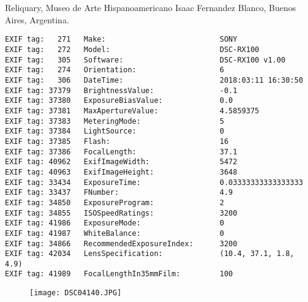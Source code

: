 \section{\protect{}}
\noindent Reliquary, Museo de Arte Hispanoamericano Isaac Fernandez Blanco, Buenos Aires, Argentina.
\noindent
\begin{lstlisting}
EXIF tag:   271   Make:                          SONY
EXIF tag:   272   Model:                         DSC-RX100
EXIF tag:   305   Software:                      DSC-RX100 v1.00
EXIF tag:   274   Orientation:                   6
EXIF tag:   306   DateTime:                      2018:03:11 16:30:50
EXIF tag: 37379   BrightnessValue:               -0.1
EXIF tag: 37380   ExposureBiasValue:             0.0
EXIF tag: 37381   MaxApertureValue:              4.5859375
EXIF tag: 37383   MeteringMode:                  5
EXIF tag: 37384   LightSource:                   0
EXIF tag: 37385   Flash:                         16
EXIF tag: 37386   FocalLength:                   37.1
EXIF tag: 40962   ExifImageWidth:                5472
EXIF tag: 40963   ExifImageHeight:               3648
EXIF tag: 33434   ExposureTime:                  0.03333333333333333
EXIF tag: 33437   FNumber:                       4.9
EXIF tag: 34850   ExposureProgram:               2
EXIF tag: 34855   ISOSpeedRatings:               3200
EXIF tag: 41986   ExposureMode:                  0
EXIF tag: 41987   WhiteBalance:                  0
EXIF tag: 34866   RecommendedExposureIndex:      3200
EXIF tag: 42034   LensSpecification:             (10.4, 37.1, 1.8, 4.9)
EXIF tag: 41989   FocalLengthIn35mmFilm:         100

\end{lstlisting}
\clearpage
\begin{figure}
\raggedleft
\texttt{[image: DSC04140.JPG]}
\end{figure}


\clearpage
